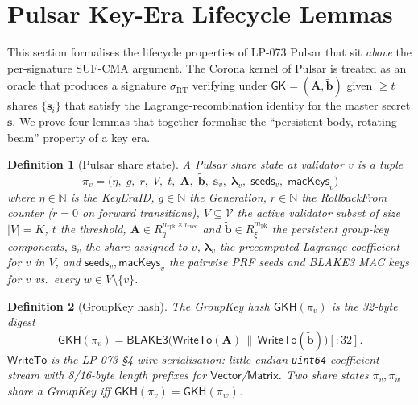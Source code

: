\documentclass[11pt]{article}
\newtheorem{definition}{Definition}
\begin{document}
\section{Pulsar Key-Era Lifecycle Lemmas}
\label{sec:lifecycle}

This section formalises the lifecycle properties of LP-073 Pulsar that
sit \emph{above} the per-signature SUF-CMA argument. The Corona kernel
of Pulsar is treated as an oracle that produces a signature
$\sigma_{\mathrm{RT}}$ verifying under
$\mathsf{GK} = (\mathbf{A}, \tilde{\mathbf{b}})$ given $\geq t$ shares
$\{\mathbf{s}_i\}$ that satisfy the Lagrange-recombination identity for
the master secret $\mathbf{s}$. We prove four lemmas that together
formalise the ``persistent body, rotating beam'' property of a key era.

\begin{definition}[Pulsar share state]
\label{def:share-state}
A Pulsar share state at validator $v$ is a tuple
\[
  \pi_v = \bigl(
    \eta,\; g,\; r,\;
    V,\; t,\;
    \mathbf{A},\; \tilde{\mathbf{b}},\;
    \mathbf{s}_v,\; \boldsymbol\lambda_v,\;
    \mathsf{seeds}_v,\; \mathsf{macKeys}_v
  \bigr)
\]
where $\eta \in \mathbb{N}$ is the \emph{KeyEraID}, $g \in \mathbb{N}$
the \emph{Generation}, $r \in \mathbb{N}$ the \emph{RollbackFrom}
counter ($r = 0$ on forward transitions),
$V \subseteq \mathcal{V}$ the active validator subset of size $|V| = K$,
$t$ the threshold, $\mathbf{A} \in R_q^{m_{\mathrm{pk}} \times
n_{\mathrm{vec}}}$ and $\tilde{\mathbf{b}} \in R_\xi^{m_{\mathrm{pk}}}$
the persistent group-key components, $\mathbf{s}_v$ the share assigned
to $v$, $\boldsymbol\lambda_v$ the precomputed Lagrange coefficient for
$v$ in $V$, and $\mathsf{seeds}_v, \mathsf{macKeys}_v$ the pairwise PRF
seeds and BLAKE3 MAC keys for $v$ vs.\ every $w \in V \setminus \{v\}$.
\end{definition}

\begin{definition}[GroupKey hash]
\label{def:gkh}
The \emph{GroupKey hash} $\mathsf{GKH}(\pi_v)$ is the 32-byte digest
\[
  \mathsf{GKH}(\pi_v) = \mathsf{BLAKE3}\bigl(
    \mathsf{WriteTo}(\mathbf{A}) \,\|\,
    \mathsf{WriteTo}(\tilde{\mathbf{b}})
  \bigr)[:32].
\]
$\mathsf{WriteTo}$ is the LP-073 \S4 wire serialisation: little-endian
\texttt{uint64} coefficient stream with 8/16-byte length prefixes for
$\mathsf{Vector}$/$\mathsf{Matrix}$. Two share states $\pi_v, \pi_w$
\emph{share a GroupKey} iff $\mathsf{GKH}(\pi_v) = \mathsf{GKH}(\pi_w)$.
\end{definition}
\end{document}
